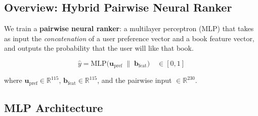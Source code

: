 \documentclass[12pt, a4paper]{article}
\begin{document}
\subsection{Overview: Hybrid Pairwise Neural Ranker}

We train a \textbf{pairwise neural ranker}: a multilayer perceptron (MLP) that
takes as input the \emph{concatenation} of a user preference vector and a book
feature vector, and outputs the probability that the user will like that book.

\[
  \hat{y} = \text{MLP}\!\bigl(\mathbf{u}_{\text{pref}} \;\|\; \mathbf{b}_{\text{feat}}\bigr)
  \quad \in [0, 1]
\]

where $\mathbf{u}_{\text{pref}} \in \mathbb{R}^{115}$, $\mathbf{b}_{\text{feat}} \in \mathbb{R}^{115}$,
and the pairwise input $\in \mathbb{R}^{230}$.

\subsection{MLP Architecture}
\end{document}

